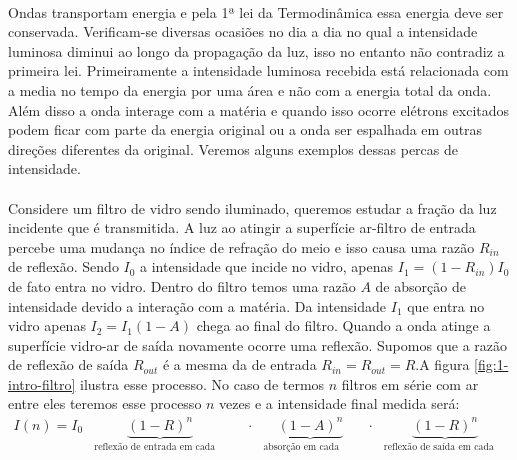 \documentclass[a4paper,11pt]{article}
\begin{document}
\paragraph{}Ondas transportam energia e pela 1ª lei da Termodinâmica essa energia deve ser conservada. Verificam-se diversas ocasiões no dia a dia no qual a intensidade luminosa diminui ao longo da propagação da luz, isso no entanto não contradiz a primeira lei. Primeiramente a intensidade luminosa recebida está relacionada com a media no tempo da energia por uma área e não com a energia total da onda. Além disso a onda interage com a matéria e quando isso ocorre elétrons excitados podem ficar com parte da energia original ou a onda ser espalhada em outras direções diferentes da original. Veremos alguns exemplos dessas percas de intensidade.

\paragraph{}Considere um filtro de vidro sendo iluminado, queremos estudar a fração da luz incidente que é transmitida. A luz ao atingir a superfície ar-filtro de entrada percebe uma mudança no índice de refração do meio e isso causa uma razão $R_{in}$ de reflexão. Sendo $I_0$ a intensidade que incide no vidro, apenas $I_1 = (1 - R_{in})I_0$ de fato entra no vidro. Dentro do filtro temos uma razão $A$ de absorção de intensidade devido a interação com a matéria. Da intensidade $I_1$ que entra no vidro apenas $I_2 = I_1(1 - A)$ chega ao final do filtro. Quando a onda atinge a superfície vidro-ar de saída novamente ocorre uma reflexão. Supomos que a razão de reflexão de saída $R_{out}$ é a mesma da de entrada $R_{in} = R_{out} = R$.A figura \ref{fig:1-intro-filtro} ilustra esse processo. No caso de termos  $n$ filtros em série com ar entre eles teremos esse processo $n$ vezes e a intensidade final medida será:
\begin{equation}
	\begin{array}{llllllll}
	I(n) = I_0 & \underbrace{(1 - R)	^n}_\textrm{reflexão de entrada em cada filtro}& &\cdot & \underbrace{(1 - A)^n}_\textrm{absorção em cada filtro} &\cdot & \underbrace{(1 - R)^n}_\textrm{reflexão de saída em cada filtro} \\
		\end{array}
	\label{eq:intro-sem-oleo}
\end{equation} 
\end{document}
